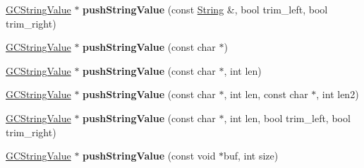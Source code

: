 \begin{DoxyCompactItemize}
\item 
\hyperlink{struct_object_script_1_1_o_s_1_1_core_1_1_g_c_string_value}{G\+C\+String\+Value} $\ast$ {\bfseries push\+String\+Value} (const \hyperlink{class_object_script_1_1_o_s_1_1_core_1_1_string}{String} \&, bool trim\+\_\+left, bool trim\+\_\+right)\hypertarget{class_object_script_1_1_o_s_1_1_core_aefa5bd9781d1cbb2a7023f2844d86e3e}{}\label{class_object_script_1_1_o_s_1_1_core_aefa5bd9781d1cbb2a7023f2844d86e3e}

\item 
\hyperlink{struct_object_script_1_1_o_s_1_1_core_1_1_g_c_string_value}{G\+C\+String\+Value} $\ast$ {\bfseries push\+String\+Value} (const char $\ast$)\hypertarget{class_object_script_1_1_o_s_1_1_core_adeb44b547c419e750bd79467e6d984eb}{}\label{class_object_script_1_1_o_s_1_1_core_adeb44b547c419e750bd79467e6d984eb}

\item 
\hyperlink{struct_object_script_1_1_o_s_1_1_core_1_1_g_c_string_value}{G\+C\+String\+Value} $\ast$ {\bfseries push\+String\+Value} (const char $\ast$, int len)\hypertarget{class_object_script_1_1_o_s_1_1_core_a602091de6f40221bb6e1a7ca4ff7adf9}{}\label{class_object_script_1_1_o_s_1_1_core_a602091de6f40221bb6e1a7ca4ff7adf9}

\item 
\hyperlink{struct_object_script_1_1_o_s_1_1_core_1_1_g_c_string_value}{G\+C\+String\+Value} $\ast$ {\bfseries push\+String\+Value} (const char $\ast$, int len, const char $\ast$, int len2)\hypertarget{class_object_script_1_1_o_s_1_1_core_a813de01dccbf1fc030d8eb56adf86768}{}\label{class_object_script_1_1_o_s_1_1_core_a813de01dccbf1fc030d8eb56adf86768}

\item 
\hyperlink{struct_object_script_1_1_o_s_1_1_core_1_1_g_c_string_value}{G\+C\+String\+Value} $\ast$ {\bfseries push\+String\+Value} (const char $\ast$, int len, bool trim\+\_\+left, bool trim\+\_\+right)\hypertarget{class_object_script_1_1_o_s_1_1_core_af5f2808efcc30e3ae99d2e67be5b3fd5}{}\label{class_object_script_1_1_o_s_1_1_core_af5f2808efcc30e3ae99d2e67be5b3fd5}

\item 
\hyperlink{struct_object_script_1_1_o_s_1_1_core_1_1_g_c_string_value}{G\+C\+String\+Value} $\ast$ {\bfseries push\+String\+Value} (const void $\ast$buf, int size)\hypertarget{class_object_script_1_1_o_s_1_1_core_a11a99d8554c849c1cbcb483aafee4350}{}\label{class_object_script_1_1_o_s_1_1_core_a11a99d8554c849c1cbcb483aafee4350}


\end{DoxyCompactItemize}

